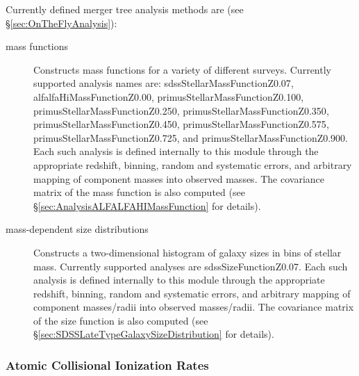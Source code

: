 Currently defined merger tree analysis methods are (see \S\ref{sec:OnTheFlyAnalysis}):
\begin{description}
 \item [mass functions] Constructs mass functions for a variety of different surveys. Currently supported analysis names are: {\normalfont \ttfamily sdssStellarMassFunctionZ0.07}, {\normalfont \ttfamily alfalfaHiMassFunctionZ0.00}, {\normalfont \ttfamily primusStellarMassFunctionZ0.100}, {\normalfont \ttfamily primusStellarMassFunctionZ0.250}, {\normalfont \ttfamily primusStellarMassFunctionZ0.350}, {\normalfont \ttfamily primusStellarMassFunctionZ0.450}, {\normalfont \ttfamily primusStellarMassFunctionZ0.575}, {\normalfont \ttfamily primusStellarMassFunctionZ0.725}, and {\normalfont \ttfamily primusStellarMassFunctionZ0.900}. Each such analysis is defined internally to this module through the appropriate redshift, binning, random and systematic errors, and arbitrary mapping of component masses into observed masses. The covariance matrix of the mass function is also computed (see \S\ref{sec:AnalysisALFALFAHIMassFunction} for details).
 \item [mass-dependent size distributions] Constructs a two-dimensional histogram of galaxy sizes in bins of stellar mass. Currently supported analyses are {\normalfont \ttfamily sdssSizeFunctionZ0.07}. Each such analysis is defined internally to this module through the appropriate redshift, binning, random and systematic errors, and arbitrary mapping of component masses/radii into observed masses/radii. The covariance matrix of the size function is also computed (see \S\ref{sec:SDSSLateTypeGalaxySizeDistribution} for details).
\end{description}

\subsubsection{Atomic Collisional Ionization Rates}

